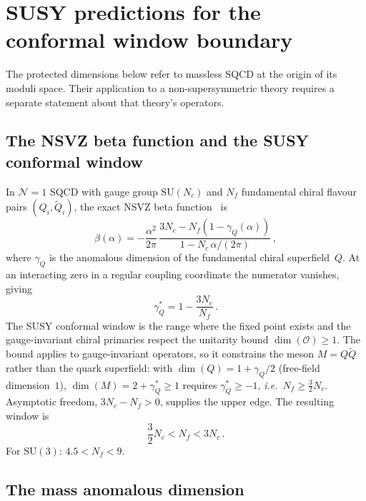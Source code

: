 \documentclass[11pt,a4paper]{article}
\theoremstyle{plain}
\theoremstyle{definition}
\theoremstyle{remark}
\newcommand{\Nc}{N_{\!c}}
\newcommand{\Nf}{N_{\!f}}
\newcommand{\SU}[1]{\mathrm{SU}(#1)}
\newcommand{\ie}{\textit{i.e.}}
\begin{document}
\section{SUSY predictions for the conformal window boundary}
\label{sec:susy-predictions}

The protected dimensions below refer to massless SQCD at the origin of
its moduli space.  Their application to a non-supersymmetric theory
requires a separate statement about that theory's operators.

\subsection{The NSVZ beta function and the SUSY conformal window}

In $\mathcal{N}=1$ SQCD with gauge group $\SU{\Nc}$ and $\Nf$
fundamental chiral flavour pairs $(Q_i, \widetilde{Q}_i)$, the exact
NSVZ beta function~\cite{NSVZ1983} is
\begin{equation}\label{eq:NSVZ}
  \beta(\alpha) = -\frac{\alpha^2}{2\pi}\,
  \frac{3\Nc - \Nf(1 - \gamma_Q(\alpha))}
       {1 - \Nc\,\alpha/(2\pi)}\,,
\end{equation}
where $\gamma_Q$ is the anomalous dimension of the fundamental chiral
superfield~$Q$.  At an interacting zero in a regular coupling
coordinate the numerator vanishes, giving
\begin{equation}\label{eq:gammaQ-star}
  \gamma_Q^* = 1 - \frac{3\Nc}{\Nf}\,.
\end{equation}
The SUSY conformal window is the range where the fixed point exists
and the gauge-invariant chiral primaries respect the unitarity bound
$\dim(\mathcal{O}) \geq 1$.  The bound applies to gauge-invariant
operators, so it constrains the meson $M = Q\widetilde{Q}$ rather than
the quark superfield: with $\dim(Q) = 1 + \gamma_Q/2$ (free-field
dimension~$1$), $\dim(M) = 2 + \gamma_Q^* \geq 1$ requires
$\gamma_Q^* \geq -1$, \ie\ $\Nf \geq \tfrac{3}{2}\Nc$.  Asymptotic
freedom, $3\Nc - \Nf > 0$, supplies the upper edge.  The resulting
window is
\begin{equation}\label{eq:SUSY-window}
  \frac{3}{2}\Nc < \Nf < 3\Nc\,.
\end{equation}
For $\SU{3}$: $4.5 < \Nf < 9$.

\subsection{The mass anomalous dimension}
\label{ssec:gamma-m}
\end{document}
